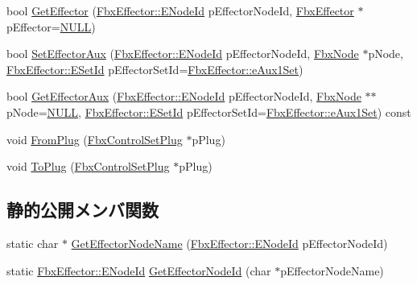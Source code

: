 \begin{DoxyCompactItemize}
\item 
bool \hyperlink{class_fbx_control_set_a9783b07eedcb540aff19bf6037070d5e}{Get\+Effector} (\hyperlink{class_fbx_effector_a26afd81fd3d41431311004c16536e739}{Fbx\+Effector\+::\+E\+Node\+Id} p\+Effector\+Node\+Id, \hyperlink{class_fbx_effector}{Fbx\+Effector} $\ast$p\+Effector=\hyperlink{fbxarch_8h_a070d2ce7b6bb7e5c05602aa8c308d0c4}{N\+U\+LL})
\item 
bool \hyperlink{class_fbx_control_set_a8c47b6a7efb2c9d086467397ef573f38}{Set\+Effector\+Aux} (\hyperlink{class_fbx_effector_a26afd81fd3d41431311004c16536e739}{Fbx\+Effector\+::\+E\+Node\+Id} p\+Effector\+Node\+Id, \hyperlink{class_fbx_node}{Fbx\+Node} $\ast$p\+Node, \hyperlink{class_fbx_effector_a49240bdb189340c6969df38067ee4811}{Fbx\+Effector\+::\+E\+Set\+Id} p\+Effector\+Set\+Id=\hyperlink{class_fbx_effector_a49240bdb189340c6969df38067ee4811aa1655dcb8be739654364c1e936419873}{Fbx\+Effector\+::e\+Aux1\+Set})
\item 
bool \hyperlink{class_fbx_control_set_a08c533d159db683fc835de93b26fd111}{Get\+Effector\+Aux} (\hyperlink{class_fbx_effector_a26afd81fd3d41431311004c16536e739}{Fbx\+Effector\+::\+E\+Node\+Id} p\+Effector\+Node\+Id, \hyperlink{class_fbx_node}{Fbx\+Node} $\ast$$\ast$p\+Node=\hyperlink{fbxarch_8h_a070d2ce7b6bb7e5c05602aa8c308d0c4}{N\+U\+LL}, \hyperlink{class_fbx_effector_a49240bdb189340c6969df38067ee4811}{Fbx\+Effector\+::\+E\+Set\+Id} p\+Effector\+Set\+Id=\hyperlink{class_fbx_effector_a49240bdb189340c6969df38067ee4811aa1655dcb8be739654364c1e936419873}{Fbx\+Effector\+::e\+Aux1\+Set}) const
\item 
void \hyperlink{class_fbx_control_set_a75413f090af90a642bb5fc7434ac805b}{From\+Plug} (\hyperlink{class_fbx_control_set_plug}{Fbx\+Control\+Set\+Plug} $\ast$p\+Plug)
\item 
void \hyperlink{class_fbx_control_set_aa498d71226be996497662a04f2f3f68d}{To\+Plug} (\hyperlink{class_fbx_control_set_plug}{Fbx\+Control\+Set\+Plug} $\ast$p\+Plug)
\end{DoxyCompactItemize}
\subsection*{静的公開メンバ関数}
\begin{DoxyCompactItemize}
\item 
static char $\ast$ \hyperlink{class_fbx_control_set_a3fab1f5e8e2c9fc176c8035009d3824f}{Get\+Effector\+Node\+Name} (\hyperlink{class_fbx_effector_a26afd81fd3d41431311004c16536e739}{Fbx\+Effector\+::\+E\+Node\+Id} p\+Effector\+Node\+Id)
\item 
static \hyperlink{class_fbx_effector_a26afd81fd3d41431311004c16536e739}{Fbx\+Effector\+::\+E\+Node\+Id} \hyperlink{class_fbx_control_set_aca82a2ca535653731c73763c5f13933c}{Get\+Effector\+Node\+Id} (char $\ast$p\+Effector\+Node\+Name)
\end{DoxyCompactItemize}
